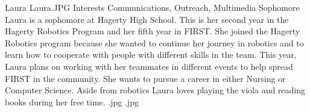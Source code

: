 \insertbio
{Laura}
{Laura.JPG}
{Interests}
{Communications, Outreach, Multimedia}
{Sophomore}
{
Laura is a sophomore at Hagerty High School. This is her second year in the Hagerty Robotics Program and her fifth year in FIRST. She joined the Hagerty Robotics program because she wanted to continue her journey in robotics and to learn how to cooperate with people with different skills in the team. This year, Laura plans on working with her teammates in different events to help spread FIRST in the community. She wants to pursue a career in either Nursing or Computer Science. Aside from robotics Laura loves playing the viola and reading books during her free time.
}
{.jpg}
{.jpg}